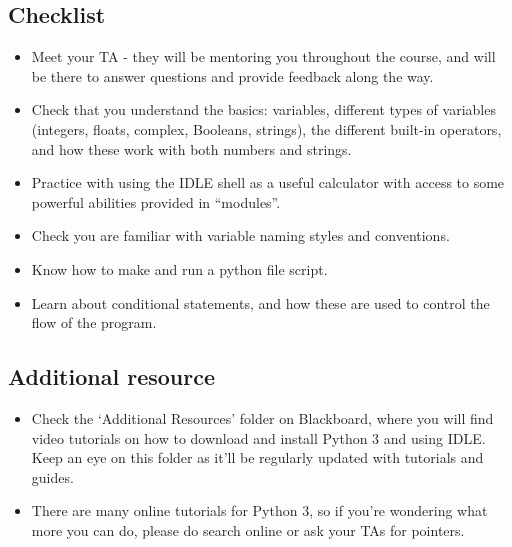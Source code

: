 \documentclass[11pt]{report}
\begin{document}
\subsection*{Checklist}
\begin{itemize}
    \item Meet your TA - they will be mentoring you throughout the course, and will be there to answer questions and provide feedback along the way.
	\item Check that you understand the basics: variables, different types of variables (integers, floats, complex, Booleans, strings), the different built-in operators, and how these work with both numbers and strings.
	\item Practice with using the IDLE shell as a useful calculator with access to some powerful abilities provided in ``modules''.
    \item Check you are familiar with variable naming styles and conventions.
    \item Know how to make and run a python file script.
	\item Learn about conditional statements, and how these are used to control the flow of the program.
\end{itemize}

\subsection*{Additional resource}
\begin{itemize}
    \item Check the `Additional Resources' folder on Blackboard, where you will find video tutorials on how to download and install Python 3 and using IDLE. Keep an eye on this folder as it'll be regularly updated with tutorials and guides.
	\item There are many online tutorials for Python 3, so if you're wondering what more you can do, please do search online or ask your TAs for pointers.
\end{itemize}
\end{document}

